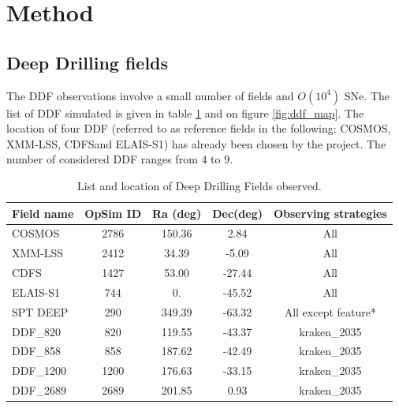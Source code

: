 \documentclass [11pt,a4paper]{article}
\newcommand{\cosmos}{COSMOS}
\newcommand{\xmmlss}{XMM-LSS}
\newcommand{\cdfs}{CDFS}
\newcommand{\elais}{ELAIS-S1}
\newcommand{\spt}{SPT DEEP}
\newcommand{\ddfa}{DDF\_820}
\newcommand{\ddfb}{DDF\_858}
\newcommand{\ddfc}{DDF\_1200}
\newcommand{\ddfd}{DDF\_2689}
\begin{document}
\section{Method}

\subsection{Deep Drilling fields}
The DDF  observations involve a  small number of fields  and $O(10^4)$
SNe. The list of DDF simulated is given in table
\ref{tab:ddf_list} and on figure \ref{fig:ddf_map}. The location of four DDF (referred to as reference fields in the following: \cosmos, \xmmlss, \cdfs and \elais) has already been chosen by the project. The number of considered DDF ranges from 4 to 9.


\begin{table}[!htbp]
  \begin{center}
  \begin{tabular}{|l|c|c|c|c|}
    \hline
    Field name & OpSim ID & Ra (deg) & Dec(deg) & Observing strategies\\
    \hline
    \cosmos & 2786 & 150.36 & 2.84 &All \\
    \xmmlss & 2412 & 34.39 & -5.09 & All \\
    \cdfs & 1427 & 53.00 & -27.44 & All \\
    \elais & 744 & 0.  & -45.52 & All \\
    \spt & 290 & 349.39 & -63.32 & All except feature*\\
    \ddfa & 820 & 119.55 & -43.37 & kraken\_2035\\
    \ddfb & 858 & 187.62 & -42.49 & kraken\_2035\\
    \ddfc & 1200 & 176.63 & -33.15 & kraken\_2035\\
    \ddfd & 2689 & 201.85 & 0.93 & kraken\_2035\\
    \hline
  \end{tabular}
  \caption{List and location of Deep Drilling Fields observed.}\label{tab:ddf_list}
  \end{center}
\end{table}
\end{document}
